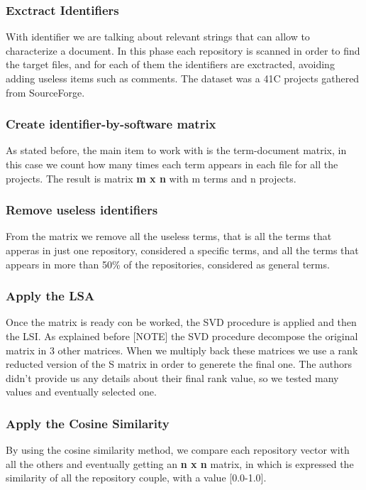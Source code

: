 \documentclass[11pt]{article} %
\begin{document}
\subsubsection{Exctract Identifiers}
With identifier we are talking about relevant strings that can allow to characterize a document. In this phase each repository is scanned in order to find the target files, and for each of them the identifiers are exctracted, avoiding adding useless items such as comments. The dataset was a 41C projects gathered from SourceForge.

\subsubsection{Create identifier-by-software matrix}
As stated before, the main item to work with is the term-document matrix, in this case we count how many times each term appears in each file for all the projects. The result is matrix \textbf{m x n} with m terms and n projects.

\subsubsection{Remove useless identifiers}
From the matrix we remove all the useless terms, that is all the terms that apperas in just one repository, considered a specific terms, and all the terms that appears in more than 50\% of the repositories, considered as general terms.

\subsubsection{Apply the LSA}
Once the matrix is ready con be worked, the SVD procedure is applied and then the LSI. As explained before [NOTE] the SVD procedure decompose the original matrix in 3 other matrices. When we multiply back these matrices we use a rank reducted version of the S matrix in order to generete the final one. The authors didn't provide us any details about their final rank value, so we tested many values and eventually selected one.

\subsubsection{Apply the Cosine Similarity}
By using the cosine similarity method, we compare each repository vector with all the others and eventually getting an \textbf{n x n} matrix, in which is expressed the similarity of all the repository couple, with a value [0.0-1.0].
\end{document}
